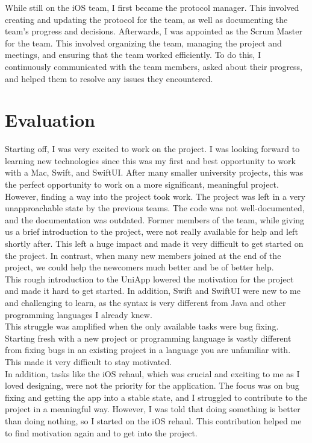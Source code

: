 \documentclass[sf-font,usefira,english]{uulm/sp/article}
\begin{document}
While still on the iOS team, I first became the protocol manager. 
This involved creating and updating the protocol for the team, as well as documenting the team’s progress and decisions. 
Afterwards, I was appointed as the Scrum Master for the team. 
This involved organizing the team, managing the project and meetings, and ensuring that the team worked efficiently. 
To do this, I continuously communicated with the team members, asked about their progress, and helped them to resolve any issues they encountered. 

\section{Evaluation}

Starting off, I was very excited to work on the project. 
I was looking forward to learning new technologies since this was my first and best opportunity to work with a Mac, Swift, and SwiftUI. 
After many smaller university projects, this was the perfect opportunity to work on a more significant, meaningful project.\\

However, finding a way into the project took work. 
The project was left in a very unapproachable state by the previous teams. 
The code was not well-documented, and the documentation was outdated. 
Former members of the team, while giving us a brief introduction to the project, were not really available for help and left shortly after. 
This left a huge impact and made it very difficult to get started on the project. 
In contrast, when many new members joined at the end of the project, we could help the newcomers much better and be of better help.\\

This rough introduction to the UniApp lowered the motivation for the project and made it hard to get started. 
In addition, Swift and SwiftUI were new to me and challenging to learn, as the syntax is very different from Java and other programming languages I already knew.\\
This struggle was amplified when the only available tasks were bug fixing. 
Starting fresh with a new project or programming language is vastly different from fixing bugs in an existing project in a language you are unfamiliar with. 
This made it very difficult to stay motivated.\\
In addition, tasks like the iOS rehaul, which was crucial and exciting to me as I loved designing, were not the priority for the application. 
The focus was on bug fixing and getting the app into a stable state, and I struggled to contribute to the project in a meaningful way. 
However, I was told that doing something is better than doing nothing, so I started on the iOS rehaul.
This contribution helped me to find motivation again and to get into the project.\\
\end{document}
